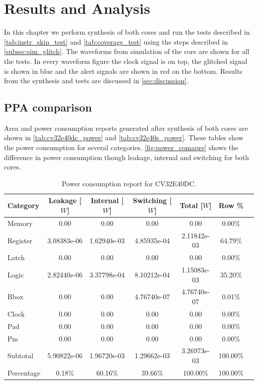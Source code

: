 \chapter{Results and Analysis}
\label{chap5}

In this chapter we perform synthesis of both cores and run the tests described in \autoref{tab:instr_skip_test} and \autoref{tab:coverage_test} using the steps described in \autoref{subsec:sim_glitch}. The waveforms from simulation of the core are shown for all the tests. In every waveform figure the clock signal is on top, the glitched signal is shown in blue and the alert signals are shown in red on the bottom. Results from the synthesis and tests are discussed in \autoref{sec:discussion}.

\section{PPA comparison}
\label{sec:synth_comparison}

Area and power consumption reports generated after synthesis of both cores are shown in \autoref{tab:cv32e40dc_power} and \autoref{tab:cv32e40s_power}. These tables show the power consumption for several categories. \autoref{fig:power_comapre} shows the difference in power consumption though leakage, internal and switching for both cores. 

\begin{table}[h]
\centering
\caption{Power consumption report for CV32E40DC.}
\label{tab:cv32e40dc_power}
\begin{tabular}{l|cccccc}
\toprule
Category & Leakage [$W$] & Internal [$W$] & Switching [$W$] & Total [$W$] & Row \% \\
\midrule
\rowcolor{black!20} Memory & 0.00 & 0.00 & 0.00 & 0.00 & 0.00\% \\
Register & 3.08383e-06 & 1.62940e-03 & 4.85935e-04 & 2.11842e-03 & 64.79\% \\
\rowcolor{black!20}Latch & 0.00 & 0.00 & 0.00 & 0.00 & 0.00\% \\
Logic & 2.82440e-06 & 3.37798e-04 & 8.10212e-04 & 1.15083e-03 & 35.20\% \\
\rowcolor{black!20}Bbox & 0.00 & 0.00 & 4.76740e-07 & 4.76740e-07 & 0.01\% \\
Clock & 0.00 & 0.00 & 0.00 & 0.00 & 0.00\% \\
\rowcolor{black!20}Pad & 0.00 & 0.00 & 0.00 & 0.00 & 0.00\% \\
Pm & 0.00 & 0.00 & 0.00 & 0.00 & 0.00\% \\
\midrule
\rowcolor{black!20} Subtotal & 5.90822e-06 & 1.96720e-03 & 1.29662e-03 & 3.26973e-03 & 100.00\% \\
Percentage & 0.18\% & 60.16\% & 39.66\% & 100.00\% & 100.00\% \\
\bottomrule
\end{tabular}
\end{table}

